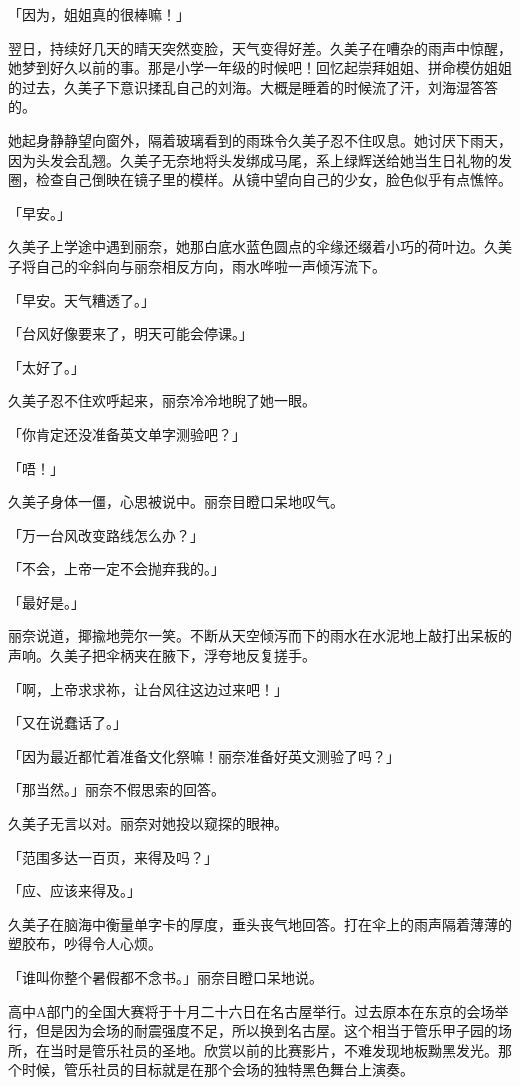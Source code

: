 \documentclass[UTF8]{ctexart}
\begin{document}
    「因为，姐姐真的很棒嘛！」 

    翌日，持续好几天的晴天突然变脸，天气变得好差。久美子在嘈杂的雨声中惊醒，她梦到好久以前的事。那是小学一年级的时候吧！回忆起崇拜姐姐、拼命模仿姐姐的过去，久美子下意识揉乱自己的刘海。大概是睡着的时候流了汗，刘海湿答答的。 

    她起身静静望向窗外，隔着玻璃看到的雨珠令久美子忍不住叹息。她讨厌下雨天，因为头发会乱翘。久美子无奈地将头发绑成马尾，系上绿辉送给她当生日礼物的发圈，检查自己倒映在镜子里的模样。从镜中望向自己的少女，脸色似乎有点憔悴。 

    「早安。」 

    久美子上学途中遇到丽奈，她那白底水蓝色圆点的伞缘还缀着小巧的荷叶边。久美子将自己的伞斜向与丽奈相反方向，雨水哗啦一声倾泻流下。 

    「早安。天气糟透了。」 

    「台风好像要来了，明天可能会停课。」 

    「太好了。」 

    久美子忍不住欢呼起来，丽奈冷冷地睨了她一眼。 

    「你肯定还没准备英文单字测验吧？」 

    「唔！」 

    久美子身体一僵，心思被说中。丽奈目瞪口呆地叹气。 

    「万一台风改变路线怎么办？」 

    「不会，上帝一定不会抛弃我的。」 

    「最好是。」 

    丽奈说道，揶揄地莞尔一笑。不断从天空倾泻而下的雨水在水泥地上敲打出呆板的声响。久美子把伞柄夹在腋下，浮夸地反复搓手。 

    「啊，上帝求求祢，让台风往这边过来吧！」 

    「又在说蠢话了。」 

    「因为最近都忙着准备文化祭嘛！丽奈准备好英文测验了吗？」 

    「那当然。」丽奈不假思索的回答。 

    久美子无言以对。丽奈对她投以窥探的眼神。 

    「范围多达一百页，来得及吗？」 

    「应、应该来得及。」 

    久美子在脑海中衡量单字卡的厚度，垂头丧气地回答。打在伞上的雨声隔着薄薄的塑胶布，吵得令人心烦。 

    「谁叫你整个暑假都不念书。」丽奈目瞪口呆地说。 

    高中A部门的全国大赛将于十月二十六日在名古屋举行。过去原本在东京的会场举行，但是因为会场的耐震强度不足，所以换到名古屋。这个相当于管乐甲子园的场所，在当时是管乐社员的圣地。欣赏以前的比赛影片，不难发现地板黝黑发光。那个时候，管乐社员的目标就是在那个会场的独特黑色舞台上演奏。 
\end{document}
